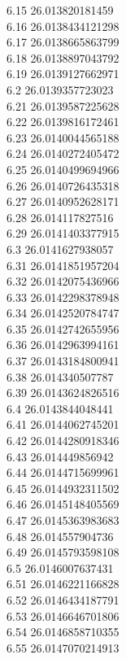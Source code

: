 {6.15	26.013820181459\\
6.16	26.0138434121298\\
6.17	26.0138665863799\\
6.18	26.0138897043792\\
6.19	26.0139127662971\\
6.2	26.0139357723023\\
6.21	26.0139587225628\\
6.22	26.0139816172461\\
6.23	26.0140044565188\\
6.24	26.0140272405472\\
6.25	26.0140499694966\\
6.26	26.0140726435318\\
6.27	26.0140952628171\\
6.28	26.014117827516\\
6.29	26.0141403377915\\
6.3	26.0141627938057\\
6.31	26.0141851957204\\
6.32	26.0142075436966\\
6.33	26.0142298378948\\
6.34	26.0142520784747\\
6.35	26.0142742655956\\
6.36	26.0142963994161\\
6.37	26.0143184800941\\
6.38	26.014340507787\\
6.39	26.0143624826516\\
6.4	26.0143844048441\\
6.41	26.0144062745201\\
6.42	26.0144280918346\\
6.43	26.014449856942\\
6.44	26.0144715699961\\
6.45	26.0144932311502\\
6.46	26.0145148405569\\
6.47	26.0145363983683\\
6.48	26.014557904736\\
6.49	26.0145793598108\\
6.5	26.0146007637431\\
6.51	26.0146221166828\\
6.52	26.0146434187791\\
6.53	26.0146646701806\\
6.54	26.0146858710355\\
6.55	26.0147070214913\\
}
